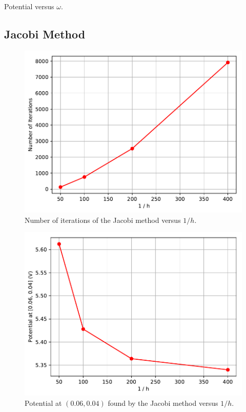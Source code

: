 \documentclass[a4paper,titlepage]{article}
\begin{document}
	\begin{table}[!htb]
		\centering
		\caption{Potential versus $\omega$.}
		\label{tabel:q3c_potential}
	\end{table}
	
	\subsection{Jacobi Method}
	
	\begin{figure}[!htb]
		\centering
		\includegraphics[width=\columnwidth]{plots/q3d_iterations.pdf}
		\caption
		{Number of iterations of the Jacobi method versus $1/h$.}
		\label{fig:q3d_iterations}
	\end{figure}

	\begin{figure}[!htb]
		\centering
		\includegraphics[width=\columnwidth]{plots/q3d_potential.pdf}
		\caption
		{Potential at $(0.06, 0.04)$ found by the Jacobi method versus $1/h$.}
		\label{fig:q3d_potential}
	\end{figure}
\end{document}
